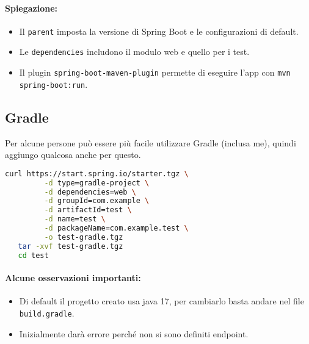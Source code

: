 \paragraph{Spiegazione:}
\begin{itemize}
  \item Il \texttt{parent} imposta la versione di Spring Boot e le configurazioni di default.
  \item Le \texttt{dependencies} includono il modulo web e quello per i test.
  \item Il plugin \texttt{spring-boot-maven-plugin} permette di eseguire l'app con \texttt{mvn spring-boot:run}.
\end{itemize}
\pagebreak
\subsection{Gradle}

Per alcune persone può essere più facile utilizzare Gradle (inclusa me), quindi aggiungo qualcosa anche per questo. 



\begin{lstlisting}[language=bash, caption={Creazione di un progetto Spring Boot con Gradle}]
curl https://start.spring.io/starter.tgz \
         -d type=gradle-project \
         -d dependencies=web \
         -d groupId=com.example \
         -d artifactId=test \
         -d name=test \
         -d packageName=com.example.test \
         -o test-gradle.tgz
   tar -xvf test-gradle.tgz
   cd test
\end{lstlisting}

\paragraph{Alcune osservazioni importanti:}

\begin{itemize}
\item Di default il progetto creato usa java 17, per cambiarlo basta andare nel file \texttt{build.gradle}.
\item Inizialmente darà errore perché non si sono definiti endpoint.
\end{itemize}

